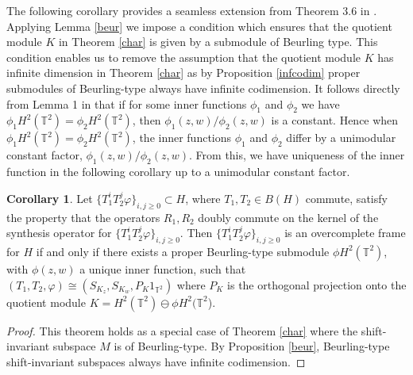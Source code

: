 \documentclass[12pt,reqno]{amsart}
\theoremstyle{definition}
\theoremstyle{definition}
\newtheorem{corollary}[theorem]{Corollary}
\numberwithin{equation}{section}
\begin{document}
The following corollary provides a seamless extension from Theorem 3.6 in \cite{CHP20}. Applying Lemma \ref{beur} we impose a condition which ensures that the quotient module $K$ in Theorem \ref{char} is given by a submodule of Beurling type. This condition enables us to remove the assumption that the quotient module $K$ has infinite dimension in Theorem \ref{char} as by Proposition \ref{infcodim} proper submodules of Beurling-type always have infinite codimension. 
It follows directly from Lemma 1 in \cite{R85} that if for some inner functions $\phi_1$ and $\phi_2$ we have
$\phi_1 H^2(\mathbb{T}^2) = \phi_2 H^2(\mathbb{T}^2)$, then $\phi_1(z,w)/\phi_2(z,w)$ is a constant. 
Hence when 
$\phi_1 H^2(\mathbb{T}^2) = \phi_2 H^2(\mathbb{T}^2)$, the inner functions $\phi_1$ and $\phi_2$ differ by a unimodular constant factor, $\phi_1(z,w)/\phi_2(z,w)$. From this, we have uniqueness of the inner function in the following corollary up to a unimodular constant factor.  
 \begin{corollary}\label{B-type}
Let $\{T_1^iT_2^j\varphi\}_{i,j \geq 0} \subset H$, where $T_1, T_2  \in B(H)$ commute, satisfy the property that the operators $R_1, R_2$ doubly commute on the kernel of the synthesis operator for $\{T_1^iT_2^j\varphi\}_{i,j \geq 0}$. Then $\{T_1^iT_2^j\varphi\}_{i,j \geq 0}$ is an overcomplete frame for $H$ if and only if there exists a proper Beurling-type submodule $\phi H^2(\mathbb{T}^2)$, with $\phi (z,w)$ a unique inner function, such that $(T_1, T_2, \varphi)\cong (S_{K_z}, S_{K_w}, P_{K} {1}_{\mathbb{T}^2})$ where $P_{K}$ is the orthogonal projection onto the quotient module $K = H^2(\mathbb{T}^2) \ominus \phi H^2(\mathbb{T}^2$).    
\end{corollary}
\begin{proof}
This theorem holds as a special case of Theorem \ref{char} where the shift-invariant subspace $M$ is of Beurling-type. By Proposition \ref{beur}, Beurling-type shift-invariant subspaces always have infinite codimension.

\end{proof}
\end{document}
